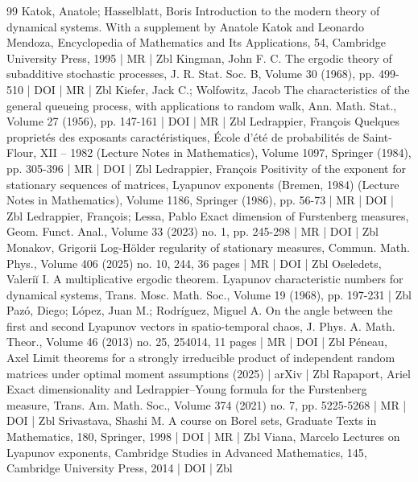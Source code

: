 \documentclass[10pt]{amsart}
\theoremstyle{definition}\newtheorem{defi}[theo]{Definition}\newtheorem{rema}[theo]{Remark}\newtheorem{exam}[theo]{Example}\newtheorem{exem}[theo]{Example}\newtheorem{nota}[theo]{Notation}
\begin{document}
\begin{thebibliography}{99}
 Katok, Anatole; Hasselblatt, Boris Introduction to the modern theory of dynamical systems. With a supplement by Anatole Katok and Leonardo Mendoza, Encyclopedia of Mathematics and Its Applications, 54, Cambridge University Press, 1995 | MR | Zbl
 Kingman, John F. C. The ergodic theory of subadditive stochastic processes, J. R. Stat. Soc. B, Volume 30 (1968), pp. 499-510 | DOI | MR | Zbl
 Kiefer, Jack C.; Wolfowitz, Jacob The characteristics of the general queueing process, with applications to random walk, Ann. Math. Stat., Volume 27 (1956), pp. 147-161 | DOI | MR | Zbl
 Ledrappier, François Quelques proprietés des exposants caractéristiques, École d’été de probabilités de Saint-Flour, XII – 1982 (Lecture Notes in Mathematics), Volume 1097, Springer (1984), pp. 305-396 | MR | DOI | Zbl
 Ledrappier, François Positivity of the exponent for stationary sequences of matrices, Lyapunov exponents (Bremen, 1984) (Lecture Notes in Mathematics), Volume 1186, Springer (1986), pp. 56-73 | MR | DOI | Zbl
 Ledrappier, François; Lessa, Pablo Exact dimension of Furstenberg measures, Geom. Funct. Anal., Volume 33 (2023) no. 1, pp. 245-298 | MR | DOI | Zbl
 Monakov, Grigorii Log-Hölder regularity of stationary measures, Commun. Math. Phys., Volume 406 (2025) no. 10, 244, 36 pages | MR | DOI | Zbl
 Oseledets, Valeriĭ I. A multiplicative ergodic theorem. Lyapunov characteristic numbers for dynamical systems, Trans. Mosc. Math. Soc., Volume 19 (1968), pp. 197-231 | Zbl
 Pazó, Diego; López, Juan M.; Rodríguez, Miguel A. On the angle between the first and second Lyapunov vectors in spatio-temporal chaos, J. Phys. A. Math. Theor., Volume 46 (2013) no. 25, 254014, 11 pages | MR | DOI | Zbl
 Péneau, Axel Limit theorems for a strongly irreducible product of independent random matrices under optimal moment assumptions (2025) | arXiv | Zbl
 Rapaport, Ariel Exact dimensionality and Ledrappier–Young formula for the Furstenberg measure, Trans. Am. Math. Soc., Volume 374 (2021) no. 7, pp. 5225-5268 | MR | DOI | Zbl
 Srivastava, Shashi M. A course on Borel sets, Graduate Texts in Mathematics, 180, Springer, 1998 | DOI | MR | Zbl
 Viana, Marcelo Lectures on Lyapunov exponents, Cambridge Studies in Advanced Mathematics, 145, Cambridge University Press, 2014 | DOI | Zbl
\end{thebibliography}
\end{document}
